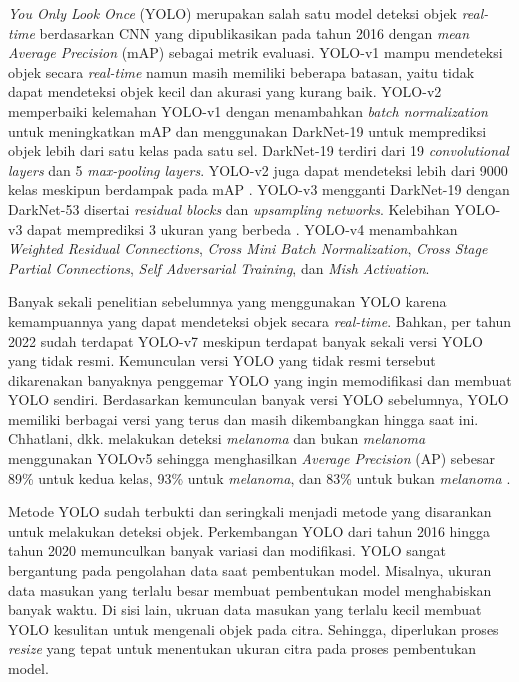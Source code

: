     \textit{You Only Look Once} (YOLO) merupakan salah satu model deteksi objek \textit{real-time} berdasarkan CNN yang dipublikasikan pada tahun 2016 \citep{Redmon2016a} dengan \textit{mean Average Precision} (mAP) sebagai metrik evaluasi. YOLO-v1 mampu mendeteksi objek secara \textit{real-time} namun masih memiliki beberapa batasan, yaitu tidak dapat mendeteksi objek kecil dan akurasi yang kurang baik. YOLO-v2 memperbaiki kelemahan YOLO-v1 dengan menambahkan \textit{batch normalization} untuk meningkatkan mAP dan menggunakan DarkNet-19 untuk memprediksi objek lebih dari satu kelas pada satu sel. DarkNet-19 terdiri dari 19 \textit{convolutional layers} dan 5 \textit{max-pooling layers}. YOLO-v2 juga dapat mendeteksi lebih dari 9000 kelas meskipun berdampak pada mAP \citep{Redmon2017}. YOLO-v3 mengganti DarkNet-19 dengan DarkNet-53 disertai \textit{residual blocks} dan \textit{upsampling networks}. Kelebihan YOLO-v3 dapat memprediksi 3 ukuran yang berbeda \citep{Redmon2018}. YOLO-v4 menambahkan \textit{Weighted Residual Connections}, \textit{Cross Mini Batch Normalization}, \textit{Cross Stage Partial Connections}, \textit{Self Adversarial Training}, dan \textit{Mish Activation}.

    Banyak sekali penelitian sebelumnya yang menggunakan YOLO karena kemampuannya yang dapat mendeteksi objek secara \textit{real-time}. Bahkan, per tahun 2022 sudah terdapat YOLO-v7 meskipun terdapat banyak sekali versi YOLO yang tidak resmi. Kemunculan versi YOLO yang tidak resmi tersebut dikarenakan banyaknya penggemar YOLO yang ingin memodifikasi dan membuat YOLO sendiri. Berdasarkan kemunculan banyak versi YOLO sebelumnya, YOLO memiliki berbagai versi yang terus dan masih dikembangkan hingga saat ini. Chhatlani, dkk. melakukan deteksi \textit{melanoma} dan bukan \textit{melanoma} menggunakan YOLOv5 sehingga menghasilkan \textit{Average Precision} (AP) sebesar 89\% untuk kedua kelas, 93\% untuk \textit{melanoma}, dan 83\% untuk bukan \textit{melanoma} \citep{Chhatlani2022a}.
    
    Metode YOLO sudah terbukti dan seringkali menjadi metode yang disarankan untuk melakukan deteksi objek. Perkembangan YOLO dari tahun 2016 hingga tahun 2020 memunculkan banyak variasi dan modifikasi. YOLO sangat bergantung pada pengolahan data saat pembentukan model. Misalnya, ukuran data masukan yang terlalu besar membuat pembentukan model menghabiskan banyak waktu. Di sisi lain, ukruan data masukan yang terlalu kecil membuat YOLO kesulitan untuk mengenali objek pada citra. Sehingga, diperlukan proses \textit{resize} yang tepat untuk menentukan ukuran citra pada proses pembentukan model.
    
